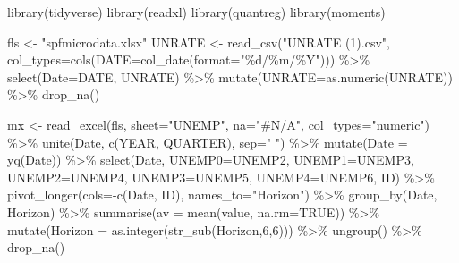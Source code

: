 \documentclass[
  letterpaper,
]{book}
\newenvironment{Shaded}{\begin{snugshade}}{\end{snugshade}}
\newcommand{\AttributeTok}[1]{\textcolor[rgb]{0.40,0.45,0.13}{#1}}
\newcommand{\ConstantTok}[1]{\textcolor[rgb]{0.56,0.35,0.01}{#1}}
\newcommand{\DecValTok}[1]{\textcolor[rgb]{0.68,0.00,0.00}{#1}}
\newcommand{\FunctionTok}[1]{\textcolor[rgb]{0.28,0.35,0.67}{#1}}
\newcommand{\NormalTok}[1]{\textcolor[rgb]{0.00,0.23,0.31}{#1}}
\newcommand{\OtherTok}[1]{\textcolor[rgb]{0.00,0.23,0.31}{#1}}
\newcommand{\SpecialCharTok}[1]{\textcolor[rgb]{0.37,0.37,0.37}{#1}}
\newcommand{\StringTok}[1]{\textcolor[rgb]{0.13,0.47,0.30}{#1}}
\begin{document}
\begin{Shaded}
\begin{Highlighting}[]
\FunctionTok{library}\NormalTok{(tidyverse)}
\FunctionTok{library}\NormalTok{(readxl)}
\FunctionTok{library}\NormalTok{(quantreg)}
\FunctionTok{library}\NormalTok{(moments)}

\NormalTok{fls    }\OtherTok{\textless{}{-}} \StringTok{"spfmicrodata.xlsx"}
\NormalTok{UNRATE }\OtherTok{\textless{}{-}} \FunctionTok{read\_csv}\NormalTok{(}\StringTok{"UNRATE (1).csv"}\NormalTok{, }\AttributeTok{col\_types=}\FunctionTok{cols}\NormalTok{(}\AttributeTok{DATE=}\FunctionTok{col\_date}\NormalTok{(}\AttributeTok{format=}\StringTok{"\%d/\%m/\%Y"}\NormalTok{))) }\SpecialCharTok{\%\textgreater{}\%}
  \FunctionTok{select}\NormalTok{(}\AttributeTok{Date=}\NormalTok{DATE, UNRATE) }\SpecialCharTok{\%\textgreater{}\%} 
  \FunctionTok{mutate}\NormalTok{(}\AttributeTok{UNRATE=}\FunctionTok{as.numeric}\NormalTok{(UNRATE)) }\SpecialCharTok{\%\textgreater{}\%}
  \FunctionTok{drop\_na}\NormalTok{()}

\NormalTok{mx }\OtherTok{\textless{}{-}} \FunctionTok{read\_excel}\NormalTok{(fls, }\AttributeTok{sheet=}\StringTok{"UNEMP"}\NormalTok{, }\AttributeTok{na=}\StringTok{"\#N/A"}\NormalTok{, }\AttributeTok{col\_types=}\StringTok{"numeric"}\NormalTok{) }\SpecialCharTok{\%\textgreater{}\%}
  \FunctionTok{unite}\NormalTok{(Date, }\FunctionTok{c}\NormalTok{(YEAR, QUARTER), }\AttributeTok{sep=}\StringTok{" "}\NormalTok{) }\SpecialCharTok{\%\textgreater{}\%} 
  \FunctionTok{mutate}\NormalTok{(}\AttributeTok{Date =} \FunctionTok{yq}\NormalTok{(Date)) }\SpecialCharTok{\%\textgreater{}\%} 
  \FunctionTok{select}\NormalTok{(Date, }\AttributeTok{UNEMP0=}\NormalTok{UNEMP2, }\AttributeTok{UNEMP1=}\NormalTok{UNEMP3, }\AttributeTok{UNEMP2=}\NormalTok{UNEMP4, }\AttributeTok{UNEMP3=}\NormalTok{UNEMP5, }\AttributeTok{UNEMP4=}\NormalTok{UNEMP6, ID) }\SpecialCharTok{\%\textgreater{}\%}
  \FunctionTok{pivot\_longer}\NormalTok{(}\AttributeTok{cols=}\SpecialCharTok{{-}}\FunctionTok{c}\NormalTok{(Date, ID), }\AttributeTok{names\_to=}\StringTok{"Horizon"}\NormalTok{) }\SpecialCharTok{\%\textgreater{}\%} 
  \FunctionTok{group\_by}\NormalTok{(Date, Horizon) }\SpecialCharTok{\%\textgreater{}\%} 
  \FunctionTok{summarise}\NormalTok{(}\AttributeTok{av   =} \FunctionTok{mean}\NormalTok{(value, }\AttributeTok{na.rm=}\ConstantTok{TRUE}\NormalTok{)) }\SpecialCharTok{\%\textgreater{}\%} 
  \FunctionTok{mutate}\NormalTok{(}\AttributeTok{Horizon =} \FunctionTok{as.integer}\NormalTok{(}\FunctionTok{str\_sub}\NormalTok{(Horizon,}\DecValTok{6}\NormalTok{,}\DecValTok{6}\NormalTok{))) }\SpecialCharTok{\%\textgreater{}\%} 
  \FunctionTok{ungroup}\NormalTok{() }\SpecialCharTok{\%\textgreater{}\%}
  \FunctionTok{drop\_na}\NormalTok{() }


\end{Highlighting}
\end{Shaded}
\end{document}
